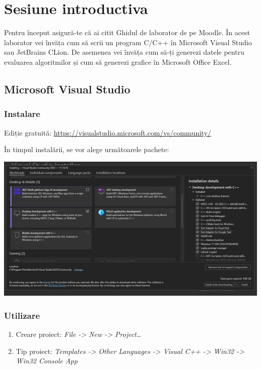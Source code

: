 \documentclass[../ro-fa-lab.tex]{subfiles}
\begin{document}
\section{\texorpdfstring{\textbf{Sesiune introductiva}}{Sesiune introductiva}}\label{intro-session}


Pentru început asigură-te că ai citit Ghidul de laborator de pe Moodle.
În acest laborator vei învăța cum să scrii un program C/C++ în Microsoft
Visual Studio sau JetBrains CLion. De asemenea vei învăța cum să-ți
generezi datele pentru evaluarea algoritmilor și cum să generezi grafice
în Microsoft Office Excel.

\subsection{Microsoft Visual Studio}\label{microsoft-visual-studio}

\subsubsection{Instalare}\label{instalare}

Ediție gratuită: \url{https://visualstudio.microsoft.com/vs/community/}

În timpul instalării, se vor alege următoarele pachete:

\includegraphics[width=\textwidth]{../Resources/lab0/vs_components.JPG}

\subsubsection{Utilizare}\label{utilizare}

\begin{enumerate}
\def\labelenumi{\arabic{enumi}.}
\item
  Creare proiect: \emph{File -\textgreater{} New -\textgreater{}
  Project\ldots{}}
\item
  Tip proiect: \emph{Templates -\textgreater{} Other Languages
  -\textgreater{} Visual C++ -\textgreater{} Win32 -\textgreater{} Win32
  Console App}
\end{enumerate}
\end{document}
